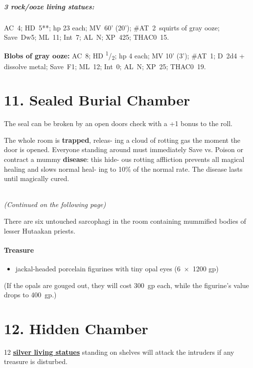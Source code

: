 \documentclass[english,11pt,openany,letterpaper,twocolumn]{book}
\newcommand{\half}{\textsuperscript{1}/\textsubscript{2}}
\begin{document}
\begin{textbox}
	\subparagraph{3 rock/ooze living statues:} AC~4; HD~5**; hp 23 each; MV~60' (20'); \#AT~2~squirts of gray ooze; Save~Dw5; ML~11; Int~7; AL~N; XP~425; THAC0~15.
	
	\tab\textbf{Blobs of gray ooze:} AC~8; HD \half; hp 4 each; MV 10' (3'); \#AT~1; D~2d4 + dissolve metal; Save~F1; ML~12; Int~0; AL~N; XP~25; THAC0~19.
\end{textbox}


\hypertarget{room11}{}
\section{11. Sealed Burial Chamber}

The seal can be broken by an open doors check with a +1 bonus to the roll.

\tab The whole room is \textbf{trapped}, releas- ing a cloud of rotting gas the moment the door is opened. Everyone standing around must immediately Save vs. Poison or contract a mummy \textbf{disease}: this hide- ous rotting affliction prevents all magical healing and slows normal heal- ing to 10\% of the normal rate. The disease lasts until magically cured.

{~\\\hfill\em(Continued on the following page)}

\break

\tab There are six untouched sarcophagi in the room containing mummified bodies of lesser Hutaakan priests.

\skipline
\paragraph{Treasure}
\begin{itemize}[leftmargin=*]
	\item jackal-headed porcelain figurines with tiny opal eyes (6~×~1200 gp)
\end{itemize}

(If the opals are gouged out, they will cost 300~gp each, while the figurine's value drops to 400~gp.)


\hypertarget{room12}{}
\section{12. Hidden Chamber}

12 \hyperlink{statue}{\textbf{silver living statues}} standing on shelves will attack the intruders if any treasure is disturbed.
\end{document}
